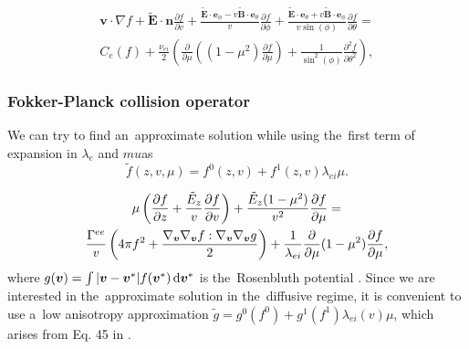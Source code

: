 \documentclass[preprint,12pt]{elsarticle}
\newcommand{\pdv}[2]{\frac{\partial{#1}}{\partial{#2}}}
\newcommand{\vect}[1]{\boldsymbol{#1}}
\newcommand{\dI}{\text{d}}
\newcommand{\mfpe}{\lambda_e}
\newcommand{\mfpei}{\lambda_{ei}}
\newcommand{\vmag}{v}
\newcommand{\vn}{\vect{n}}
\newcommand{\tE}{\vect{\tilde{E}}}
\newcommand{\tEz}{\tilde{E}_z}
\newcommand{\tB}{\vect{\tilde{B}}}
\newcounter{bla}
\begin{document}
\begin{multline}
  \vect{v}\cdot\nabla f + \tE\cdot\vn \pdv{f}{\vmag} 
  + \frac{\tE\cdot\vect{e}_\phi 
  - \vmag\tB\cdot\vect{e}_\theta}{\vmag}\pdv{f}{\phi}
  + \frac{\tE\cdot\vect{e}_\theta + \vmag\tB\cdot\vect{e}_\phi}
  {\vmag\sin(\phi)}\pdv{f}{\theta} 
  =\\
  C_e(f) 
  + \frac{\nu_{ei}}{2} 
  \left(\pdv{}{\mu}\left((1 - \mu^2)\pdv{f}{\mu}\right)
  + \frac{1}{\sin^2(\phi)}\frac{\partial^2f}{\partial\theta^2} \right) ,
  \label{eq:Lorentz_spherical}
\end{multline}

\subsubsection{Fokker-Planck collision operator}\label{sec:FP_cop}
We can try to find an~approximate solution while using the~first term of
expansion in $\mfpe$ and $mu$as
\begin{equation}
  \tilde{f}(z, \vmag, \mu) = f^0(z, \vmag) + f^1(z, \vmag) \mfpei\mu .
  \label{eq:f_low_approximation}
\end{equation}

\newcommand{\gt}{g}
\begin{multline}
  \mu\left(\pdv{f}{z} + \frac{\tEz}{\vmag}\pdv{f}{\vmag}\right) 
  + \frac{\tEz(1-\mu^2)}{\vmag^2}\pdv{f}{\mu}
  = \\ 
  \frac{\Gamma^{ee}}{\vmag} \left(4\pi f^2 
  + \frac{\gv\gv \ft : \gv\gv \gt}{2}\right)
  + \frac{1}{\mfpei}\pdv{}{\mu}(1 - \mu^2)\pdv{f}{\mu} ,
  \nonumber
\end{multline}
where $g(\vv) = \int |\vv - \vv^*| f(\vv^*)\, \dI\vv^*$ is 
the~Rosenbluth potential \cite{Rosenbluth}. Since we are interested in 
the~approximate solution in the~diffusive regime, it is convenient to
use a~low anisotropy approximation 
$\tilde{\gt} = \gt^0(f^0) + \gt^1(f^1) \mfpei(\vmag) \mu$, which arises from 
Eq. 45 in \cite{Rosenbluth}.
\end{document}
